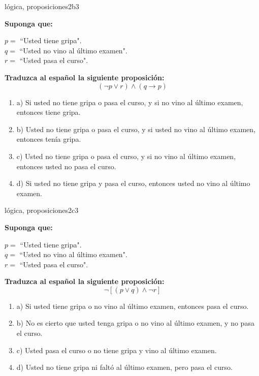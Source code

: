 \documentclass{article}
\begin{document}
\begin{question}{11}{lógica, proposiciones}{2}{b}{3}{
\textbf{Suponga que:} \medskip

\(p = \) ``Usted tiene gripa".\\
\(q = \) ``Usted no vino al último examen".\\
\(r = \) ``Usted pasa el curso". \medskip

\textbf{Traduzca al español la siguiente proposición:}
\[
(\neg p \lor r) \land (q \rightarrow p)
\]

\begin{enumerate}
   \item a) Si usted no tiene gripa o pasa el curso, y si no vino al último examen, entonces tiene gripa.  
   \item b) Usted no tiene gripa o pasa el curso, y si usted no vino al último examen, entonces tenía gripa.  
   \item c) Usted no tiene gripa o pasa el curso, y si no vino al último examen, entonces usted no pasa el curso.  
   \item d) Si usted no tiene gripa y pasa el curso, entonces usted no vino al último examen.  
\end{enumerate}
}
\end{question}

\begin{question}{12}{lógica, proposiciones}{2}{c}{3}{
\textbf{Suponga que:} \medskip

\(p = \) ``Usted tiene gripa".\\
\(q = \) ``Usted no vino al último examen".\\
\(r = \) ``Usted pasa el curso". \medskip

\textbf{Traduzca al español la siguiente proposición:}
\[
\neg [(p \lor q) \land \neg r]
\]

\begin{enumerate}
   \item a) Si usted tiene gripa o no vino al último examen, entonces pasa el curso.  
   \item b) No es cierto que usted tenga gripa o no vino al último examen, y no pasa el curso.  
   \item c) Usted pasa el curso o no tiene gripa y vino al último examen.  
   \item d) Usted no tiene gripa ni faltó al último examen, pero pasa el curso.  
\end{enumerate}
}
\end{question}
\end{document}
